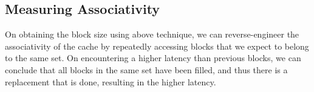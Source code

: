 \documentclass[12pt,a4paper,english]{paper}
\begin{document}
\subsection{Measuring Associativity}
On obtaining the block size using above technique, we can reverse-engineer the associativity of the cache by repeatedly accessing blocks that we expect to belong to the same set. On encountering a higher latency than previous blocks, we can conclude that all blocks in the same set have been filled, and thus there is a replacement that is done, resulting in the higher latency.


\newpage %



\end{document}

